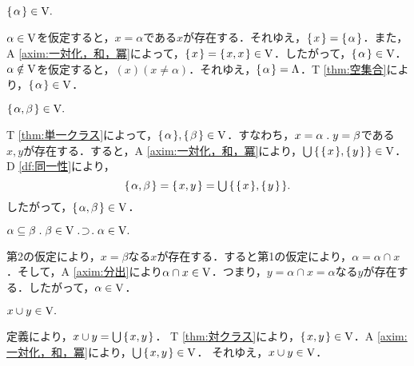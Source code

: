 \begin{thm}[単一クラス]
\label{thm:単一クラス}
$
    \{\mspace{2mu}\alpha\mspace{2mu}\}\in\mathrm{V}.
$
\end{thm}
\begin{pf}
    $\alpha\in\mathrm{V}$を仮定すると，$x = \alpha$である$x$が存在する．それゆえ，$ \{\mspace{2mu}x\mspace{2mu}\}=\{\mspace{2mu}\alpha\mspace{2mu}\} $．また，A \ref{axim:一対化，和，冪}によって，$\{\mspace{2mu}x\mspace{2mu}\}=\{\mspace{2mu}x,x\mspace{2mu}\}\in\mathrm{V}$．したがって，$\{\mspace{2mu}\alpha\mspace{2mu}\}\in\mathrm{V}$．
    $\alpha\notin\mathrm{V}$を仮定すると，$(x)(x\neq\alpha)$．それゆえ，$\{\mspace{2mu}\alpha\mspace{2mu}\}=\Lambda$．T \ref{thm:空集合}により，$\{\mspace{2mu}\alpha\mspace{2mu}\}\in\mathrm{V}$．
\end{pf}

\begin{thm}[対クラス]
\label{thm:対クラス}
$
    \{\mspace{2mu}\alpha,\beta\mspace{2mu}\}\in\mathrm{V}.
$
\end{thm}
\begin{pf}
    T \ref{thm:単一クラス}によって，$\{\mspace{2mu}\alpha\mspace{2mu}\},\{\mspace{2mu}\beta\mspace{2mu}\}\in\mathrm{V}$．すなわち，$ x = \alpha\con{1}y = \beta $である$ x,y $が存在する．すると，A \ref{axim:一対化，和，冪}により，${\textstyle\bigcup}\mspace{3mu}\{\mspace{2mu}\{\mspace{2mu}x\mspace{2mu}\},\{\mspace{2mu}y\mspace{2mu}\}\mspace{2mu}\}\in\mathrm{V}$．D \ref{df:同一性}により，
    \[
        \{\mspace{2mu}\alpha,\beta\mspace{2mu}\}=\{\mspace{2mu}x,y\mspace{2mu}\}={\textstyle\bigcup}\mspace{3mu}\{\mspace{2mu}\{\mspace{2mu}x\mspace{2mu}\},\{\mspace{2mu}y\mspace{2mu}\}\mspace{2mu}\}.
    \]
    したがって，$ \{\mspace{2mu}\alpha,\beta\mspace{2mu}\}\in\mathrm{V} $．
\end{pf}

\begin{thm}[部分クラス]
\label{thm:部分クラス}
$
    \alpha\subseteq\beta\con{1}\beta\in\univ\case{1}{1}{1}\alpha\in\univ.
$
\end{thm}
\begin{pf}
    第2の仮定により，$ x = \beta $なる$ x $が存在する．すると第1の仮定により，$ \alpha = \alpha\cap x $．そして，A \ref{axim:分出}により$ \alpha\cap x\in\mathrm{V} $．つまり，$ y = \alpha\cap x=\alpha $なる$ y $が存在する．したがって，$\alpha\in\mathrm{V}$．
\end{pf}

\begin{thm}[合併]
\label{thm:合併}
$
    x\cup y\in\mathrm{V}.
$
\end{thm}
\begin{pf}
    定義により，$ x\cup y = {\textstyle\bigcup}\mspace{3mu}\{\mspace{2mu}x,y\mspace{2mu}\} $．
    T \ref{thm:対クラス}により，$\{\mspace{2mu}x,y\mspace{2mu}\}\in\mathrm{V}$．A \ref{axim:一対化，和，冪}により，$ {\textstyle\bigcup}\mspace{3mu}\{\mspace{2mu}x,y\mspace{2mu}\}\in\mathrm{V} $．
    それゆえ，$ x\cup y\in\mathrm{V} $．
\end{pf}
    
